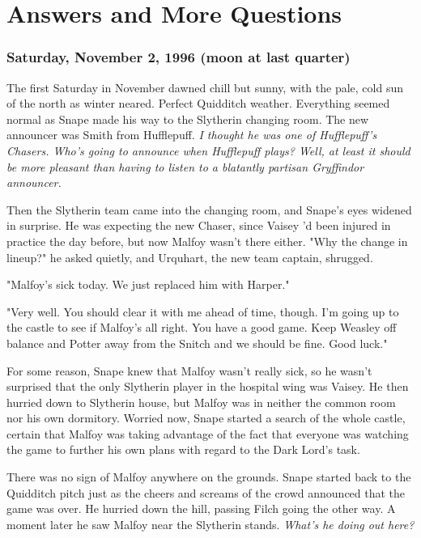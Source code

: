 
\chapter{Answers and More Questions}

\subsection{Saturday, November 2, 1996 (moon at last quarter)}

The first Saturday in November dawned chill but sunny, with the pale, cold sun of the north as winter neared. Perfect Quidditch weather. Everything seemed normal as Snape made his way to the Slytherin changing room. The new announcer was Smith from Hufflepuff. \emph{I thought he was one of Hufflepuff's Chasers. Who's going to announce when Hufflepuff plays? Well, at least it should be more pleasant than having to listen to a blatantly partisan Gryffindor announcer.}

Then the Slytherin team came into the changing room, and Snape's eyes widened in surprise. He was expecting the new Chaser, since Vaisey 'd been injured in practice the day before, but now Malfoy wasn't there either. "Why the change in lineup?" he asked quietly, and Urquhart, the new team captain, shrugged.

"Malfoy's sick today. We just replaced him with Harper."

"Very well. You should clear it with me ahead of time, though. I'm going up to the castle to see if Malfoy's all right. You have a good game. Keep Weasley off balance and Potter away from the Snitch and we should be fine. Good luck."

For some reason, Snape knew that Malfoy wasn't really sick, so he wasn't surprised that the only Slytherin player in the hospital wing was Vaisey. He then hurried down to Slytherin house, but Malfoy was in neither the common room nor his own dormitory. Worried now, Snape started a search of the whole castle, certain that Malfoy was taking advantage of the fact that everyone was watching the game to further his own plans with regard to the Dark Lord's task.

There was no sign of Malfoy anywhere on the grounds. Snape started back to the Quidditch pitch just as the cheers and screams of the crowd announced that the game was over. He hurried down the hill, passing Filch going the other way. A moment later he saw Malfoy near the Slytherin stands. \emph{What's he doing out here?}


